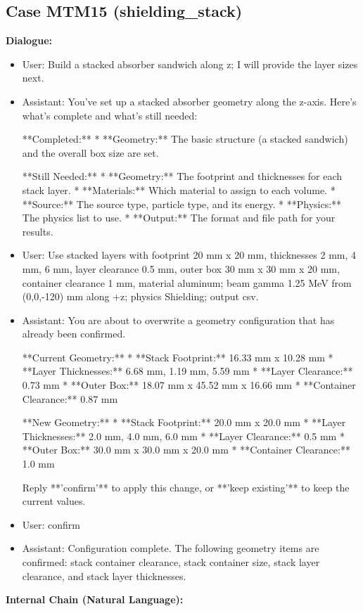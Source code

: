 \documentclass[11pt]{ctexart}
\begin{document}
\subsection{Case MTM15 (shielding\_stack)}
\textbf{Dialogue:}
\begin{itemize}
\item User: Build a stacked absorber sandwich along z; I will provide the layer sizes next.
\item Assistant: You've set up a stacked absorber geometry along the z-axis. Here's what's complete and what's still needed:

**Completed:**
*   **Geometry:** The basic structure (a stacked sandwich) and the overall box size are set.

**Still Needed:**
*   **Geometry:** The footprint and thicknesses for each stack layer.
*   **Materials:** Which material to assign to each volume.
*   **Source:** The source type, particle type, and its energy.
*   **Physics:** The physics list to use.
*   **Output:** The format and file path for your results.
\item User: Use stacked layers with footprint 20 mm x 20 mm, thicknesses 2 mm, 4 mm, 6 mm, layer clearance 0.5 mm, outer box 30 mm x 30 mm x 20 mm, container clearance 1 mm, material aluminum; beam gamma 1.25 MeV from (0,0,-120) mm along +z; physics Shielding; output csv.
\item Assistant: You are about to overwrite a geometry configuration that has already been confirmed.

**Current Geometry:**
*   **Stack Footprint:** 16.33 mm x 10.28 mm
*   **Layer Thicknesses:** 6.68 mm, 1.19 mm, 5.59 mm
*   **Layer Clearance:** 0.73 mm
*   **Outer Box:** 18.07 mm x 45.52 mm x 16.66 mm
*   **Container Clearance:** 0.87 mm

**New Geometry:**
*   **Stack Footprint:** 20.0 mm x 20.0 mm
*   **Layer Thicknesses:** 2.0 mm, 4.0 mm, 6.0 mm
*   **Layer Clearance:** 0.5 mm
*   **Outer Box:** 30.0 mm x 30.0 mm x 20.0 mm
*   **Container Clearance:** 1.0 mm

Reply **'confirm'** to apply this change, or **'keep existing'** to keep the current values.
\item User: confirm
\item Assistant: Configuration complete. The following geometry items are confirmed: stack container clearance, stack container size, stack layer clearance, and stack layer thicknesses.
\end{itemize}
\textbf{Internal Chain (Natural Language):}
\end{document}
